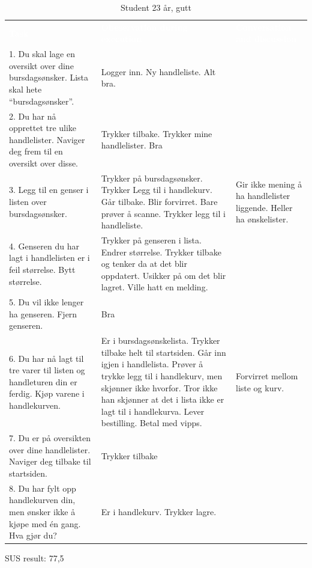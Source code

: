 \begin{table}[H]
    \caption{Student 23 år, gutt}
    \label{tab:observasjon1_4}
    \centering
    \begin{tabular}{L{15em}  L{15em} L{15em}}
        \textbf{\textcolor{white}{Task}} & \textbf{\textcolor{white}{Obeservation during execution}} & \textbf{\textcolor{white}{Conversation and discussion}}\\
        1. Du skal lage en oversikt over dine bursdagsønsker. Lista skal hete “bursdagsønsker”. & Logger inn. Ny handleliste. Alt bra. & \\
        2. Du har nå opprettet tre ulike handlelister. Naviger deg frem til en oversikt over disse. & Trykker tilbake. Trykker mine handlelister. Bra &  \\
        3. Legg til en genser i listen over bursdagsønsker. & Trykker på bursdagsønsker. Trykker Legg til i handlekurv. Går tilbake. Blir forvirret. Bare prøver å scanne. Trykker legg til i handleliste. & Gir ikke mening å ha handlelister liggende. Heller ha ønskelister.\\
        4. Genseren du har lagt i handlelisten er i feil størrelse. Bytt størrelse. & Trykker på genseren i lista. Endrer størrelse. Trykker tilbake og tenker da at det blir oppdatert. Usikker på om det blir lagret. Ville hatt en melding. & \\
        5. Du vil ikke lenger ha genseren. Fjern genseren. & Bra & \\
        6. Du har nå lagt til tre varer til listen og handleturen din er ferdig. Kjøp varene i handlekurven. & Er i bursdagsønskelista. Trykker tilbake helt til startsiden. Går inn igjen i handlelista. Prøver å trykke legg til i handlekurv, men skjønner ikke hvorfor. Tror ikke han skjønner at det i lista ikke er lagt til i handlekurva. Lever bestilling. Betal med vipps. & Forvirret mellom liste og kurv.\\
        7. Du er på oversikten over dine handlelister. Naviger deg tilbake til startsiden. & Trykker tilbake & \\
        8. Du har fylt opp handlekurven din, men ønsker ikke å kjøpe med én gang. Hva gjør du? & Er i handlekurv. Trykker lagre. & \\
    \end{tabular}
\end{table}

\noindent SUS result: 77,5

